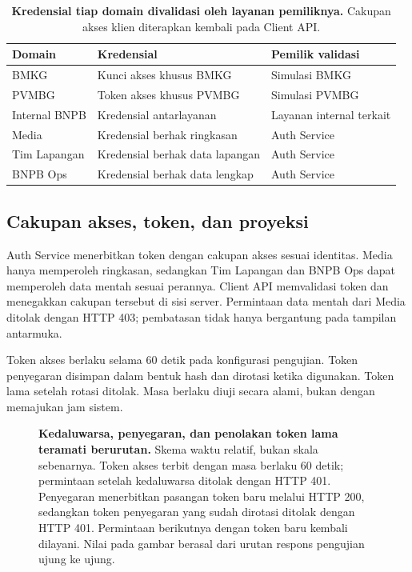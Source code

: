 \documentclass{fairmeta}
\begin{document}
\begin{table}[htbp]
\centering
\caption{\textbf{Kredensial tiap domain divalidasi oleh layanan pemiliknya.} Cakupan akses klien diterapkan kembali pada Client API.}
\label{tab:trust-domains}
\small
\begin{tabularx}{\textwidth}{@{}L{3.2cm}L{5.0cm}Y@{}}
\toprule
\textbf{Domain} & \textbf{Kredensial} & \textbf{Pemilik validasi}\\
\midrule
BMKG & Kunci akses khusus BMKG & Simulasi BMKG\\
PVMBG & Token akses khusus PVMBG & Simulasi PVMBG\\
\addlinespace[2pt]
Internal BNPB & Kredensial antarlayanan & Layanan internal terkait\\
\addlinespace[2pt]
Media & Kredensial berhak ringkasan & Auth Service\\
Tim Lapangan & Kredensial berhak data lapangan & Auth Service\\
BNPB Ops & Kredensial berhak data lengkap & Auth Service\\
\bottomrule
\end{tabularx}
\end{table}

\subsection{Cakupan akses, token, dan proyeksi}

Auth Service menerbitkan token dengan cakupan akses sesuai identitas. Media hanya memperoleh ringkasan, sedangkan Tim Lapangan dan BNPB Ops dapat memperoleh data mentah sesuai perannya. Client API memvalidasi token dan menegakkan cakupan tersebut di sisi server. Permintaan data mentah dari Media ditolak dengan HTTP 403; pembatasan tidak hanya bergantung pada tampilan antarmuka.

Token akses berlaku selama 60 detik pada konfigurasi pengujian. Token penyegaran disimpan dalam bentuk hash dan dirotasi ketika digunakan. Token lama setelah rotasi ditolak. Masa berlaku diuji secara alami, bukan dengan memajukan jam sistem.

\begin{figure}[htbp]
\centering

\caption[Siklus token akses dan penyegaran]{\textbf{Kedaluwarsa, penyegaran, dan penolakan token lama teramati berurutan.} Skema waktu relatif, bukan skala sebenarnya. Token akses terbit dengan masa berlaku 60 detik; permintaan setelah kedaluwarsa ditolak dengan HTTP 401. Penyegaran menerbitkan pasangan token baru melalui HTTP 200, sedangkan token penyegaran yang sudah dirotasi ditolak dengan HTTP 401. Permintaan berikutnya dengan token baru kembali dilayani. Nilai pada gambar berasal dari urutan respons pengujian ujung ke ujung.}
\label{fig:p3-token}
\end{figure}
\end{document}
